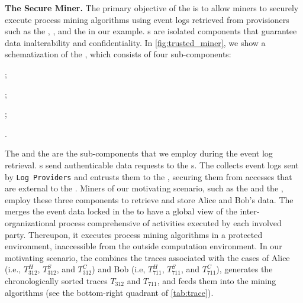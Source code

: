 \noindent\textbf{The Secure Miner.}
The primary objective of the  is to allow miners to securely execute process mining algorithms using event logs retrieved from provisioners such as the , , and the  in our example. s are isolated components that guarantee data inalterability and confidentiality. In \cref{fig:trusted_miner}, we show a schematization of the , which consists of four sub-components:
\begin{inparaenum}
    \item {};
    \item {};
    \item {}; 
    \item {}.
\end{inparaenum}
The  and the  are the sub-components that we employ during the event log retrieval. s send authenticable data requests to the s. The  collects event logs sent by \texttt{Log Providers} and entrusts them to the , securing them from accesses that are external to the .
Miners of our motivating scenario, such as the  and the , employ these three components to retrieve and store Alice and Bob's data. The  merges the event data locked in the  to have a global view of the inter-organizational process comprehensive of activities executed by each involved party. Thereupon, it executes process mining algorithms in a protected environment, inaccessible from the outside computation environment.
In our motivating scenario, the  combines the traces associated with the cases of Alice (i.e., $T^H_{312}$, $T^S_{312}$, and $T^C_{312}$) and Bob (i.e, $T^H_{711}$, $T^S_{711}$, and $T^C_{711}$), generates the chronologically sorted traces $T_{312}$ and $T_{711}$, and feeds them into the mining algorithms (see the bottom-right quadrant of \cref{tab:trace}).



